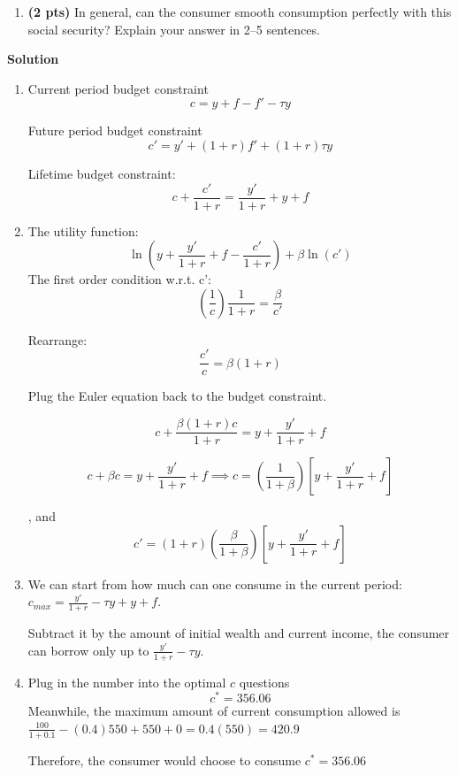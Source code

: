 \documentclass[14pt, oneside]{memoir}
\begin{document}
{{{\begin{enumerate}[label=\textbf{\arabic*.}, itemsep=15pt]
\begin{enumerate}[label=(\alph*)]
	
	\item \textbf{(2 pts)} In general, can the consumer smooth consumption perfectly with this social security? Explain your answer in 2–5 sentences.
	

\end{enumerate}

\clearpage
\textbf{Solution}
\begin{enumerate}[label=(\alph*)]
	\item 
		Current period budget constraint
		\[c = y +f -f' -\tau y\]
		
		Future period budget constraint
		\[c' = y' +(1+r)f' +(1+r)\tau y\]
		
		Lifetime budget constraint:
		\[c+\frac{c'}{1+r} = \frac{y'}{1+r} +y+f\]
	
	\item 
		The utility function:
		\[\ln\left(y + \frac{y'}{1+r} +f - \frac{c'}{1+r} \right) + \beta\ln(c')\]
		The first order condition w.r.t. c':
		\[\left(\frac{1}{c}\right) \frac{1}{1+r} = \frac{\beta}{c'}\]
		
		Rearrange:
		\[\frac{c'}{c} = \beta \left(1+r\right)\]
		
		Plug the Euler equation back to the budget constraint.
		
		\[c+\frac{ \beta \left(1+r\right) c}{1+r} = y+\frac{y'}{1+r} + f\]
		
		\[c+ \beta  c  = y+\frac{y'}{1+r} + f \implies c = \left(\frac{1}{1+\beta}\right) \left[y+\frac{y'}{1+r} + f\right] \]
		
		, and
		\[c'=  \left(1+r\right) \left(\frac{\beta}{1+\beta}\right) \left[y+\frac{y'}{1+r} + f\right] \]
	
	\clearpage
	\item We can start from how much can one consume in the current period: $c_{max} = \frac{y'}{1+r}-\tau y +y+f$.
	
	Subtract it by the amount of initial wealth and current income, the consumer can borrow only up to $\frac{y'}{1+r}-\tau y$.
	
	\item Plug in the number into the optimal $c$ questions 
	\[c^* = 356.06\]
	Meanwhile, the maximum amount of current consumption allowed is $\frac{100}{1+0.1}- (0.4) 550 +550+0  = 0.4 (550) = 420.9$
	
	Therefore, the consumer would choose to consume $c^* = 356.06$
	

\end{enumerate}
\end{enumerate}}}}
\end{document}
